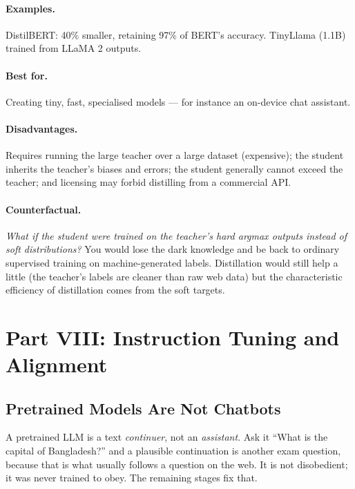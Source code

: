 \documentclass[11pt,a4paper]{article}
\begin{document}
\paragraph{Examples.} DistilBERT: 40\% smaller, retaining 97\% of BERT's accuracy.
TinyLlama (1.1B) trained from LLaMA 2 outputs.

\paragraph{Best for.} Creating tiny, fast, specialised models --- for instance an on-device
chat assistant.

\paragraph{Disadvantages.} Requires running the large teacher over a large dataset (expensive);
the student inherits the teacher's biases and errors; the student generally cannot exceed the
teacher; and licensing may forbid distilling from a commercial API.

\paragraph{Counterfactual.} \emph{What if the student were trained on the teacher's hard
argmax outputs instead of soft distributions?} You would lose the dark knowledge and be back
to ordinary supervised training on machine-generated labels. Distillation would still help a
little (the teacher's labels are cleaner than raw web data) but the characteristic efficiency
of distillation comes from the soft targets.

\section{Part VIII: Instruction Tuning and Alignment}

\subsection{Pretrained Models Are Not Chatbots}

A pretrained LLM is a text \emph{continuer}, not an \emph{assistant}. Ask it ``What is the
capital of Bangladesh?'' and a plausible continuation is another exam question, because that
is what usually follows a question on the web. It is not disobedient; it was never trained to
obey. The remaining stages fix that.
\end{document}
